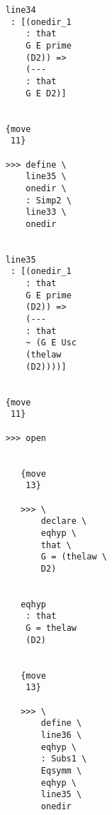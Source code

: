 \documentclass[12pt]{article}
\begin{document}
\begin{verbatim}
                                    line34 
                                     : [(onedir_1 
                                        : that 
                                        G E prime 
                                        (D2)) => 
                                        (--- 
                                        : that 
                                        G E D2)]


                                    {move 
                                     11}

                                    >>> define \
                                        line35 \
                                        onedir \
                                        : Simp2 \
                                        line33 \
                                        onedir


                                    line35 
                                     : [(onedir_1 
                                        : that 
                                        G E prime 
                                        (D2)) => 
                                        (--- 
                                        : that 
                                        ~ (G E Usc 
                                        (thelaw 
                                        (D2))))]


                                    {move 
                                     11}

                                    >>> open


                                       {move 
                                        13}

                                       >>> \
                                           declare \
                                           eqhyp \
                                           that \
                                           G = (thelaw \
                                           D2)


                                       eqhyp 
                                        : that 
                                        G = thelaw 
                                        (D2)


                                       {move 
                                        13}

                                       >>> \
                                           define \
                                           line36 \
                                           eqhyp \
                                           : Subs1 \
                                           Eqsymm \
                                           eqhyp \
                                           line35 \
                                           onedir



\end{verbatim}
\end{document}
